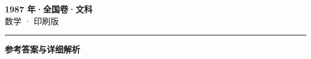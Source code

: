\documentclass[zihao=5, a4paper]{ctexart}
\begin{document}
\begin{center}
  {\Large\bfseries 1987 年·全国卷·文科}\\[4pt]
  {\large 数学 · 印刷版}
\end{center}
\medskip
{}

\par\bigskip\hrule\bigskip
{}
\begin{center}{\large\bfseries 参考答案与详细解析}\end{center}
\smallskip

\end{document}
